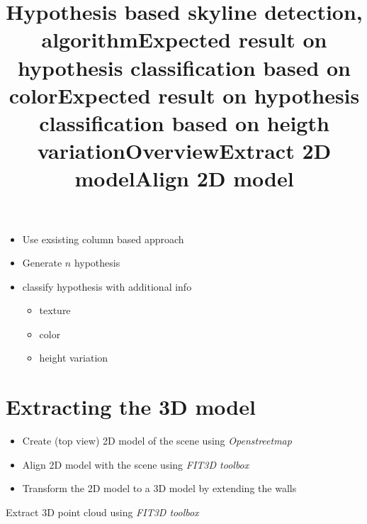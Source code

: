 \title{Hypothesis based skyline detection, algorithm}
\begin{itemize}
\item Use exsisting column based approach
\item Generate $n$ hypothesis
\item classify hypothesis with additional info
	\begin{itemize}
	\item texture 
	\item color
	\item height variation 
	\end{itemize}
\end{itemize}

\title{Expected result on hypothesis classification based on color}

\title{Expected result on hypothesis classification based on heigth variation}



%


\section{Extracting the 3D model}
\title{Overview}
\begin{itemize}
\item Create (top view) 2D model of the scene using \emph{Openstreetmap}
\item Align 2D model with the scene using \emph{FIT3D toolbox}
\item Transform the 2D model to a 3D model by extending the walls
\end{itemize}

\title{Extract 2D model}

\title{Align 2D model}
\item Extract 3D point cloud using \emph{FIT3D toolbox}

